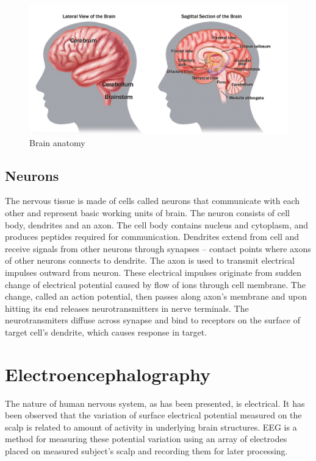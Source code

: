 \begin{figure}[ht]
	\centering
	\includegraphics[width=1\linewidth]{fig/BrainAnatomy.jpg}
	\caption[Caption for LOF]{Brain anatomy\protect\footnotemark}
	\label{fig:brainAnatomy}
\end{figure}

\subsection{Neurons}
The nervous tissue is made of cells called neurons that communicate with each
other and represent basic working units of brain. The neuron consists of cell
body, dendrites and an axon. The cell body contains nucleus and cytoplasm, and
produces peptides required for communication. Dendrites extend from cell and
receive signals from other neurons through synapses -- contact points where
axons of other neurons connects to dendrite. The axon is used to transmit
electrical impulses outward from neuron. These electrical impulses originate
from sudden change of electrical potential caused by flow of ions through cell
membrane. The change, called an action potential, then passes along axon's
membrane and upon hitting its end releases neurotransmitters in nerve terminals.
The neurotransmiters diffuse across synapse and bind to receptors on the surface
of target cell's dendrite, which causes response in target.\cite{brainFacts}

\section{Electroencephalography}
The nature of human nervous system, as has been presented, is electrical. It has
been observed that the variation of surface electrical potential measured on the
scalp is related to amount of activity in underlying brain structures. EEG is a
method for measuring these potential variation using an array of electrodes
placed on measured subject's scalp and recording them for later processing.
\cite{eegClass}

